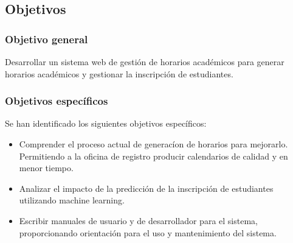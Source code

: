 \subsection{Objetivos}

\subsubsection{Objetivo general}
Desarrollar un sistema web de gestión de horarios académicos para generar horarios académicos y gestionar la inscripción de estudiantes.

\subsubsection{Objetivos específicos}
Se han identificado los siguientes objetivos específicos:
\begin{itemize}
    \item Comprender el proceso actual de generacíon de horarios para mejorarlo.
    Permitiendo a la oficina de registro producir calendarios de calidad y en menor tiempo.
    \item Analizar el impacto de la predicción de la inscripción de estudiantes utilizando machine learning.
    \item Escribir manuales de usuario y de desarrollador para el sistema, proporcionando orientación para el uso y mantenimiento del sistema.
\end{itemize}

